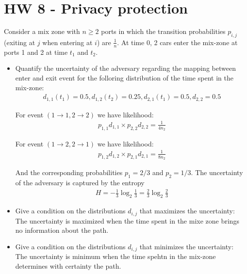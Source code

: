 \section*{HW 8 - Privacy protection}
Consider a mix zone with $n \geq 2$ ports in which the transition probabilities $p_{i,j}$ (exiting at $j$ when entering at $i$) are $\frac{1}{n}$. At time 0, 2 cars enter the mix-zone at ports 1 and 2 at time $t_1$ and $t_2$.
\begin{itemize}
	\item Quantify the uncertainty of the adversary regarding the mapping between enter and exit event for the folloring distribution of the time spent in the mix-zone:
	\begin{align*}
		d_{1,1}(t_1) = 0.5, d_{1,2}(t_2) = 0.25, d_{2,1}(t_1) = 0.5, d_{2,2} = 0.5
	\end{align*}

	For event $(1 \rightarrow 1, 2 \rightarrow 2)$ we have likelihood: 
	\begin{align*}
		p_{1,1}d_{1,1} \times p_{2,2}d_{2,2} = \frac{1}{4 n_2}
	\end{align*}

	For event $(1 \rightarrow 2, 2 \rightarrow 1)$ we have likelihood: 
	\begin{align*}
		p_{1,2}d_{1,2} \times p_{2,1}d_{2,1} = \frac{1}{8 n_2}
	\end{align*}

	And the corresponding probabilities $p_1 = 2/3$ and $p_2 = 1/3$. The uncertainty of the adversary is captured by the entropy
	\begin{align*}
		H = -\frac{1}{3} \log_2 \frac{1}{3} = \frac{2}{3} \log_2 \frac{2}{3}
	\end{align*}

	\item Give a condition on the distributions $d_{i,j}$ that maximizes the uncertainty: \\
	The uncertainty is maximized when the time spent in the mixe zone brings no information about the path.

	\item Give a condition on the distributions $d_{i,j}$ that minimizes the uncertainty: \\
	The uncertainty is minimum when the time spehtn in the mix-zone determines with certainty the path.

\end{itemize}



